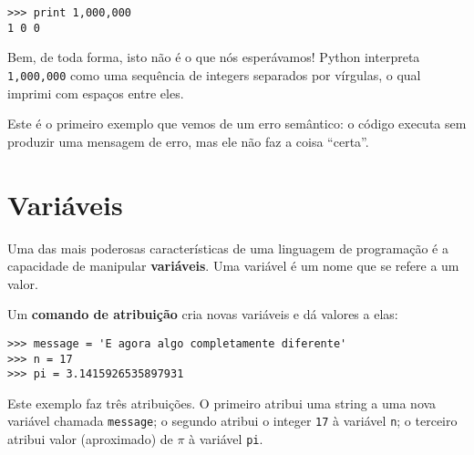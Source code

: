 \beforeverb
\begin{verbatim}
>>> print 1,000,000
1 0 0
\end{verbatim}
\afterverb
%

Bem, de toda forma, isto não é o que nós esperávamos!  Python interpreta {\tt
  1,000,000} como  uma sequência de integers separados por vírgulas, o qual 
imprimi com espaços entre eles.


Este é o primeiro exemplo que vemos de um erro semântico: o código 
executa sem produzir uma mensagem de erro, mas ele não faz a 
coisa ``certa''.

\section{Variáveis}


Uma das mais poderosas características de uma linguagem de programação é a 
capacidade de manipular {\bf variáveis}. Uma variável é um nome 
que se refere a um valor.

Um {\bf comando de atribuição} cria novas variáveis e dá 
valores a elas:

\beforeverb
\begin{verbatim}
>>> message = 'E agora algo completamente diferente'
>>> n = 17
>>> pi = 3.1415926535897931
\end{verbatim}
\afterverb
%

Este exemplo faz três atribuições. O primeiro atribui uma string 
a uma nova variável chamada {\tt message}; 
o segundo atribui o integer {\tt 17} à variável {\tt n}; o terceiro 
atribui valor (aproximado) de $\pi$ à variável {\tt pi}.

